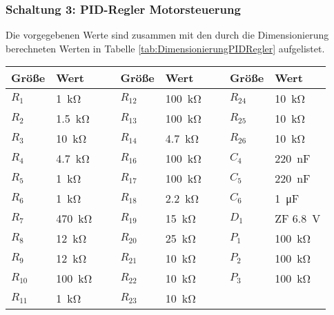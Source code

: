 \subsubsection*{Schaltung 3: PID-Regler Motorsteuerung}
%
Die vorgegebenen Werte sind zusammen mit den durch die Dimensionierung berechneten Werten in Tabelle \ref{tab:DimensionierungPIDRegler} aufgelistet.
%
\par
%
\minipage{\linewidth}
    \begin{center}
        \captionsetup{type=table}
        \begin{adjustbox}{max width=\linewidth, keepaspectratio}
            \begin{tabular}{llllllll}
            \toprule
            Größe & Wert & ~ & Größe & Wert & ~ & Größe & Wert \\
            \midrule
            $R_1$ & \SI{1}{\kilo\ohm} & ~ & $R_{12}$ & \SI{100}{\kilo\ohm} & ~ & $R_{24}$ & \SI{10}{\kilo\ohm} \\
            $R_2$ & \SI{1,5}{\kilo\ohm} & ~ & $R_{13}$ & \SI{100}{\kilo\ohm} & ~ & $R_{25}$ & \SI{10}{\kilo\ohm} \\
            $R_3$ & \SI{10}{\kilo\ohm} & ~ & $R_{14}$ & \SI{4,7}{\kilo\ohm} & ~ & $R_{26}$ & \SI{10}{\kilo\ohm} \\
            $R_4$ & \SI{4,7}{\kilo\ohm} & ~ & $R_{16}$ & \SI{100}{\kilo\ohm} & ~ & $C_4$ & \SI{220}{\nano\farad} \\
            $R_5$ & \SI{1}{\kilo\ohm} & ~ & $R_{17}$ & \SI{100}{\kilo\ohm} & ~ & $C_5$ & \SI{220}{\nano\farad} \\
            $R_6$ & \SI{1}{\kilo\ohm} & ~ & $R_{18}$ & \SI{2,2}{\kilo\ohm} & ~ & $C_6$ & \SI{1}{\micro\farad} \\
            $R_7$ & \SI{470}{\kilo\ohm} & ~ & $R_{19}$ & \SI{15}{\kilo\ohm} & ~ & $D_1$ & ZF \SI{6,8}{\volt} \\
            $R_8$ & \SI{12}{\kilo\ohm} & ~ & $R_{20}$ & \SI{25}{\kilo\ohm} & ~ & $P_1$ & \SI{100}{\kilo\ohm} \\
            $R_9$ & \SI{12}{\kilo\ohm} & ~ & $R_{21}$ & \SI{10}{\kilo\ohm} & ~ & $P_2$ & \SI{100}{\kilo\ohm} \\
            $R_{10}$ & \SI{100}{\kilo\ohm} & ~ & $R_{22}$ & \SI{10}{\kilo\ohm} & ~ & $P_3$ & \SI{100}{\kilo\ohm} \\
            $R_{11}$ & \SI{1}{\kilo\ohm} & ~ & $R_{23}$ & \SI{10}{\kilo\ohm} & ~ & ~ & ~ \\
            \bottomrule
            \end{tabular}
        \end{adjustbox}
        \label{tab:DimensionierungPIDRegler}
    \end{center}
\endminipage
%
